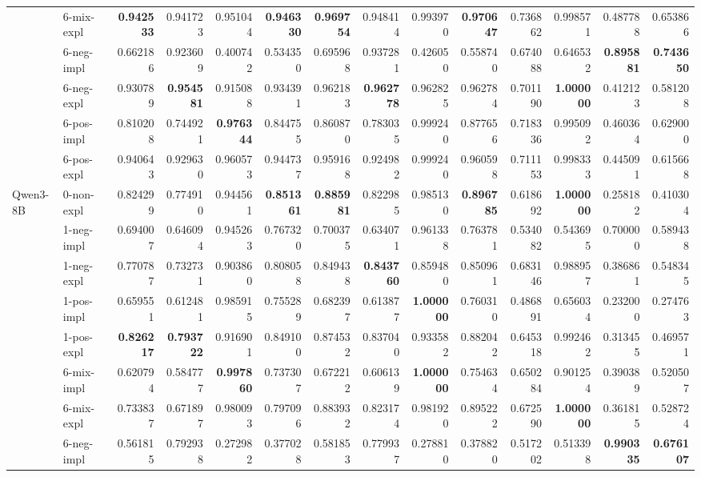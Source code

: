 \begin{tabular}{ll|rrrr|rrrr|rrrr}
 & 6-mix-expl & \bfseries 0.942533 & 0.941723 & 0.951044 & \bfseries 0.946330 & \bfseries 0.969754 & 0.948414 & 0.993970 & \bfseries 0.970647 & 0.736862 & 0.998571 & 0.487788 & 0.653866 \\
 & 6-neg-impl & 0.662186 & 0.923609 & 0.400742 & 0.534350 & 0.695968 & 0.937281 & 0.426050 & 0.558740 & 0.674088 & 0.646532 & \bfseries 0.895881 & \bfseries 0.743650 \\
 & 6-neg-expl & 0.930789 & \bfseries 0.954581 & 0.915088 & 0.934391 & 0.962183 & \bfseries 0.962778 & 0.962825 & 0.962784 & 0.701190 & \bfseries 1.000000 & 0.412123 & 0.581208 \\
 & 6-pos-impl & 0.810208 & 0.744921 & \bfseries 0.976344 & 0.844755 & 0.860870 & 0.783035 & 0.999240 & 0.877656 & 0.718336 & 0.995092 & 0.460364 & 0.629000 \\
 & 6-pos-expl & 0.940643 & 0.929630 & 0.960573 & 0.944737 & 0.959168 & 0.924982 & 0.999240 & 0.960598 & 0.711153 & 0.998333 & 0.445091 & 0.615668 \\
 \midrule
\multirow[c]{11}{*}{Qwen3-8B} & 0-non-expl & 0.824299 & 0.774910 & 0.944561 & \bfseries 0.851361 & \bfseries 0.885981 & 0.822985 & 0.985130 & \bfseries 0.896785 & 0.618692 & \bfseries 1.000000 & 0.258182 & 0.410304 \\
 & 1-neg-impl & 0.694007 & 0.646094 & 0.945263 & 0.767320 & 0.700375 & 0.634071 & 0.961338 & 0.763781 & 0.534082 & 0.543695 & 0.700000 & 0.589438 \\
 & 1-neg-expl & 0.770787 & 0.732731 & 0.903860 & 0.808058 & 0.849438 & \bfseries 0.843760 & 0.859480 & 0.850961 & 0.683146 & 0.988957 & 0.386861 & 0.548345 \\
 & 1-pos-impl & 0.659551 & 0.612481 & 0.985915 & 0.755289 & 0.682397 & 0.613877 & \bfseries 1.000000 & 0.760310 & 0.486891 & 0.656034 & 0.232000 & 0.274763 \\
 & 1-pos-expl & \bfseries 0.826217 & \bfseries 0.793722 & 0.916901 & 0.849100 & 0.874532 & 0.837040 & 0.933582 & 0.882042 & 0.645318 & 0.992462 & 0.313455 & 0.469571 \\
 & 6-mix-impl & 0.620794 & 0.584777 & \bfseries 0.997860 & 0.737307 & 0.672212 & 0.606139 & \bfseries 1.000000 & 0.754634 & 0.650284 & 0.901254 & 0.390389 & 0.520507 \\
 & 6-mix-expl & 0.733837 & 0.671897 & 0.980093 & 0.797096 & 0.883932 & 0.823174 & 0.981920 & 0.895222 & 0.672590 & \bfseries 1.000000 & 0.361815 & 0.528724 \\
 & 6-neg-impl & 0.561815 & 0.792938 & 0.272982 & 0.377028 & 0.581853 & 0.779937 & 0.278810 & 0.378820 & 0.517202 & 0.513398 & \bfseries 0.990335 & \bfseries 0.676107 \\

\end{tabular}
